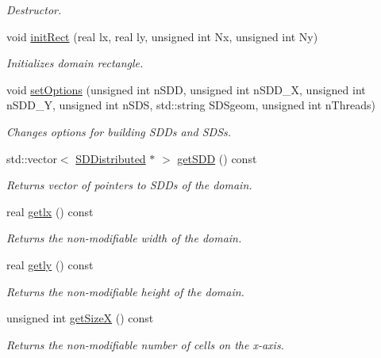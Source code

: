 \begin{DoxyCompactItemize}
\begin{DoxyCompactList}\small\item\em Destructor. \item\end{DoxyCompactList}\item 
void \hyperlink{classDomain_a853266061b629ff1f920b46c06c478d6}{initRect} (real lx, real ly, unsigned int Nx, unsigned int Ny)
\begin{DoxyCompactList}\small\item\em Initializes domain rectangle. \item\end{DoxyCompactList}\item 
void \hyperlink{classDomain_a10a5e8384b21bb3c968699c2a6c89bf7}{setOptions} (unsigned int nSDD, unsigned int nSDD\_\-X, unsigned int nSDD\_\-Y, unsigned int nSDS, std::string SDSgeom, unsigned int nThreads)
\begin{DoxyCompactList}\small\item\em Changes options for building SDDs and SDSs. \item\end{DoxyCompactList}\item 
std::vector$<$ \hyperlink{classSDDistributed}{SDDistributed} $\ast$ $>$ \hyperlink{classDomain_abdf41aefa7cf64674bce2d4a065fa372}{getSDD} () const 
\begin{DoxyCompactList}\small\item\em Returns vector of pointers to SDDs of the domain. \item\end{DoxyCompactList}\item 
real \hyperlink{classDomain_a04980b3ddcccb30a79f8fa3c9441d904}{getlx} () const 
\begin{DoxyCompactList}\small\item\em Returns the non-\/modifiable width of the domain. \item\end{DoxyCompactList}\item 
real \hyperlink{classDomain_a742a544929b9b82e0d654de8a85ab49b}{getly} () const 
\begin{DoxyCompactList}\small\item\em Returns the non-\/modifiable height of the domain. \item\end{DoxyCompactList}\item 
unsigned int \hyperlink{classDomain_a3185aba80f5397341e5a81d84e2bc8f9}{getSizeX} () const 
\begin{DoxyCompactList}\small\item\em Returns the non-\/modifiable number of cells on the x-\/axis. \item\end{DoxyCompactList}\item 

\end{DoxyCompactItemize}
